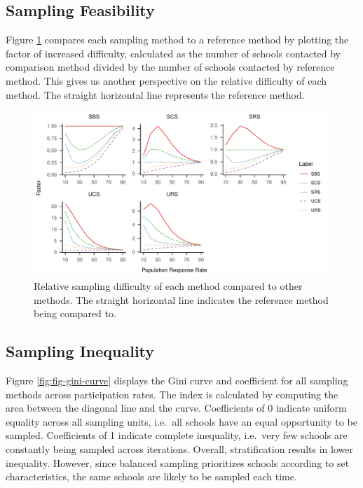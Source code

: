 \documentclass[english,man,floatsintext]{apa6}
\begin{document}
\newpage

\hypertarget{sampling-feasibility}{%
\subsection{Sampling Feasibility}\label{sampling-feasibility}}

Figure \ref{fig:fig-rel-per} compares each sampling method to a reference method by plotting the factor of increased difficulty, calculated as the number of schools contacted by comparison method divided by the number of schools contacted by reference method. This gives us another perspective on the relative difficulty of each method. The straight horizontal line represents the reference method.



\begin{figure}
\centering
\includegraphics{6---Paper_files/figure-latex/fig-rel-per-1.pdf}
\caption{\label{fig:fig-rel-per}Relative sampling difficulty of each method compared to other methods. The straight horizontal line indicates the reference method being compared to.}
\end{figure}

\newpage

\hypertarget{sampling-inequality}{%
\subsection{Sampling Inequality}\label{sampling-inequality}}

Figure \ref{fig:fig-gini-curve} displays the Gini curve and coefficient for all sampling methods across participation rates. The index is calculated by computing the area between the diagonal line and the curve. Coefficients of 0 indicate uniform equality across all sampling units, i.e.~all schools have an equal opportunity to be sampled. Coefficients of 1 indicate complete inequality, i.e.~very few schools are constantly being sampled across iterations. Overall, stratification results in lower inequality. However, since balanced sampling prioritizes schools according to set characteristics, the same schools are likely to be sampled each time.
\end{document}
